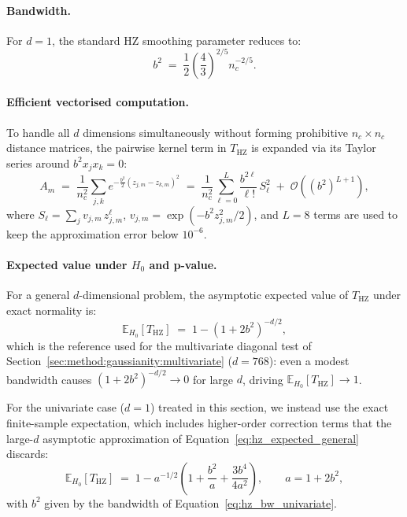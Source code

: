 \paragraph{Bandwidth.}
For $d=1$, the standard HZ smoothing parameter reduces to:
\begin{equation}
	b^2 \;=\; \frac{1}{2}\left(\frac{4}{3}\right)^{2/5} n_c^{-2/5}.
	\label{eq:hz_bw_univariate}
\end{equation}

\paragraph{Efficient vectorised computation.}
To handle all $d$ dimensions simultaneously without forming prohibitive $n_c \times n_c$ distance matrices, the pairwise kernel term in $T_{\mathrm{HZ}}$ is expanded via its Taylor series around $b^2 x_j x_k = 0$:
\begin{equation}
	A_m \;=\; \frac{1}{n_c^2}\sum_{j,k} e^{-\frac{b^2}{2}(z_{j,m}-z_{k,m})^2}
	\;=\; \frac{1}{n_c^2}\sum_{\ell=0}^{L}
	\frac{b^{2\ell}}{\ell!}\,S_\ell^2\;+\;\mathcal{O}\!\left((b^2)^{L+1}\right),
	\label{eq:hz_taylor}
\end{equation}
where $S_\ell = \sum_j v_{j,m}\,z_{j,m}^\ell$, $v_{j,m} = \exp(-b^2 z_{j,m}^2 / 2)$, and $L=8$ terms are used to keep the approximation error below $10^{-6}$.

\paragraph{Expected value under $H_0$ and p-value.}
For a general $d$-dimensional problem, the asymptotic expected value of $T_{\mathrm{HZ}}$ under exact normality is:
\begin{equation}
	\mathbb{E}_{H_0}[T_{\mathrm{HZ}}] \;=\; 1 - (1 + 2b^2)^{-d/2},
	\label{eq:hz_expected_general}
\end{equation}
which is the reference used for the multivariate diagonal test of Section~\ref{sec:method:gaussianity:multivariate} ($d=768$): even a modest bandwidth causes $(1+2b^2)^{-d/2}\to 0$ for large $d$, driving $\mathbb{E}_{H_0}[T_{\mathrm{HZ}}]\to 1$.

For the univariate case ($d=1$) treated in this section, we instead use the exact finite-sample expectation, which includes higher-order correction terms that the large-$d$ asymptotic approximation of Equation~\eqref{eq:hz_expected_general} discards:
\begin{equation}
	\mathbb{E}_{H_0}[T_{\mathrm{HZ}}] \;=\; 1 - a^{-1/2}\left(1 + \frac{b^2}{a} + \frac{3b^4}{4a^2}\right), \qquad a = 1+2b^2,
	\label{eq:hz_expected_univariate}
\end{equation}
with $b^2$ given by the bandwidth of Equation~\eqref{eq:hz_bw_univariate}. 

